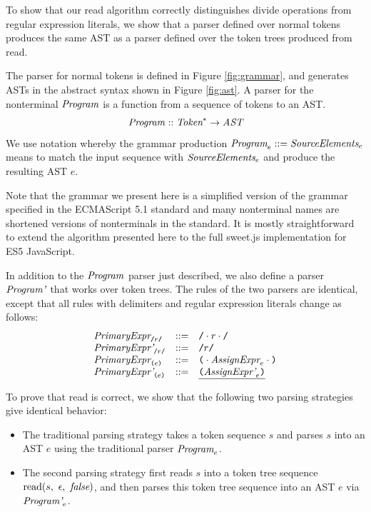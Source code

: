 \documentclass[preprint,10pt]{sigplanconf}
\begin{document}
To show that our read algorithm correctly distinguishes 
divide operations from regular expression literals, we show that
a parser defined over normal tokens produces the same AST as a parser
defined over the token trees produced from read.

The parser for normal tokens is defined in Figure \ref{fig:grammar},
and generates ASTs in the abstract syntax shown in Figure \ref{fig:ast}. A
parser for the nonterminal \( \textit{Program}_{} \) is a function from a
sequence of tokens to an AST.
\[
\textit{Program}_{} :: \textit{Token}^* \rightarrow \textit{AST}
\]
We use notation whereby the grammar production $\textit{Program}_{e} ::= \textit{SourceElements}_{e}$
means to match the input sequence with $\textit{SourceElements}_{e}$ and
produce the resulting AST $e$.

Note that the grammar we present here is a simplified version of the
grammar specified in the ECMAScript 5.1 standard \cite{International2011}
and many nonterminal names are shortened
versions of nonterminals in the standard.
It is mostly straightforward to extend the algorithm
presented here 
to 
the full sweet.js implementation for ES5 JavaScript.

In addition to the \( \textit{Program}_{} \) parser just described, we
also define a parser \( \textit{Program'}_{} \) that works over token
trees. The rules of the two parsers are identical, except that
all rules with delimiters and regular expression literals change as follows:
\[
\begin{array}{lcl}
  \textit{PrimaryExpr}_{\texttt{/}r\texttt{/}} &::=& \texttt{/}\cdot r \cdot \texttt{/}
  \\
  \textit{PrimaryExpr'}_{\texttt{/}r\texttt{/}} &::=& \texttt{/}r\texttt{/}
  \\
  \textit{PrimaryExpr}_{\texttt{(} e \texttt{)}} &::=& 
  \texttt{(} \cdot \textit{AssignExpr}_{e} \cdot \texttt{)}
  \\
  \textit{PrimaryExpr'}_{\texttt{(} e \texttt{)}} &::=& 
  \underline{ \texttt{(} \textit{AssignExpr'}_{e} \texttt{)}}
  \\
\end{array}
\]

To prove that read is correct, we show that the following two parsing
strategies give identical behavior:
\begin{itemize}
\item The traditional parsing strategy takes a token sequence \( s
  \) and parses \( s \) into an AST \( e \) using the traditional parser
  \( \textit{Program}_{e} \).

\item The second parsing strategy first reads \( s \) into a token
  tree sequence \( \textrm{read}(s,~\epsilon,~\textit{false}) \), and then parses
  this token tree sequence into an AST \( e \) via \( \textit{Program'}_{e} \).
\end{itemize}
\end{document}
